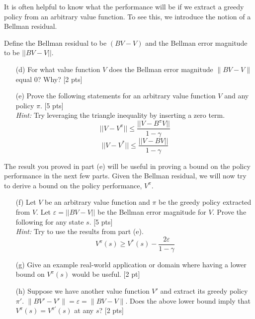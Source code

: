 \documentclass[11pt]{article}
\let\epsilon\varepsilon
\begin{document}
It is often helpful to know what the performance will be if we extract a greedy policy from an arbitrary value function. To see this, we introduce the notion of a Bellman residual.

Define the Bellman residual to be $(BV - V)$ and the Bellman error magnitude to be $||BV - V||$.

\begin{enumerate}
    \item[(d)] For what value function $V$ does the Bellman error magnitude $\|BV - V \|$ equal 0? Why? [2 pts]\newpage
    \item[(e)] Prove the following statements for an arbitrary value function $V$ and any policy $\pi$.  [5 pts]\\
    \textit{Hint:} Try leveraging the triangle inequality by inserting a zero term.
    \begin{equation}
        ||V - V^\pi|| \leq \frac{||V - B^\pi V||}{1-\gamma}
    \end{equation}
    \begin{equation}
        ||V - V^*|| \leq \frac{||V - BV||}{1-\gamma}
    \end{equation}
    \newpage
\end{enumerate}

\noindent The result you proved in part (e) will be useful in proving a bound on the policy performance in the next few parts. Given the Bellman residual, we will now try to derive a bound on the policy performance, $V^\pi$.

\begin{enumerate}
    \item[(f)] Let $V$ be an arbitrary value function and $\pi$ be the greedy policy extracted from $V$. Let $\epsilon = ||BV-V||$ be the Bellman error magnitude for $V$. Prove the following for any state $s$. [5 pts]\\
    \textit{Hint:} Try to use the results from part (e).
    \begin{equation}
        V^\pi(s) \geq V^*(s) - \frac{2\epsilon}{1-\gamma}
    \end{equation}
    \newpage
    \item[(g)] Give an example real-world application or domain where having a lower bound on $V^\pi(s)$ would be useful. [2 pt]\newpage

    \item[(h)] Suppose we have another value function $V'$ and extract its greedy policy $\pi'$.  $\|B V' - V' \| = \epsilon = \|B V - V\|$. Does the above lower bound imply that $V^\pi(s) = V^{\pi'}(s)$ at any $s$? [2 pts]

\end{enumerate}
\end{document}
